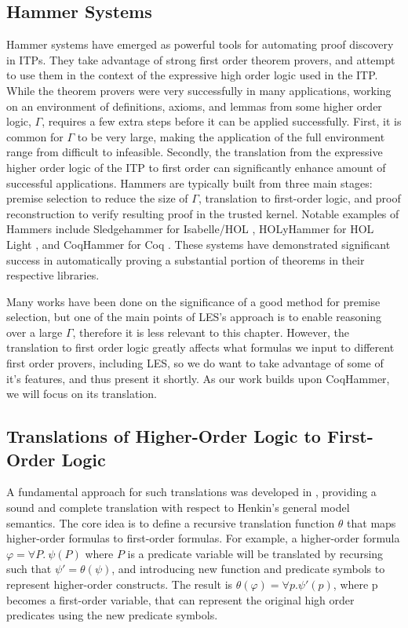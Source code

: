 \subsection{Hammer Systems}

Hammer systems have emerged as powerful tools for automating proof discovery in ITPs. 
They take advantage of strong first order theorem provers, and attempt to use them in the context of the expressive high order logic used in the ITP.
While the theorem provers were very successfully in many applications, working on an environment of definitions, axioms, and lemmas from some higher order logic, $\Gamma$, requires a few extra steps before it can be applied successfully.
First, it is common for $\Gamma$ to be very large, making the application of the full environment range from difficult to infeasible.
Secondly, the translation from the expressive higher order logic of the ITP to first order can significantly enhance amount of successful applications.
Hammers are typically built from three main stages: premise selection to reduce the size of $\Gamma$, translation to first-order logic, and proof reconstruction to verify resulting proof in the trusted kernel.
Notable examples of Hammers include Sledgehammer for Isabelle/HOL \cite{sledgehammer}, HOLyHammer for HOL Light \cite{holyhammer}, and CoqHammer for Coq \cite{coqhammer}. 
These systems have demonstrated significant success in automatically proving a substantial portion of theorems in their respective libraries.

Many works have been done on the significance of a good method for premise selection, but one of the main points of LES's approach is to enable reasoning over a large $\Gamma$, therefore it is less relevant to this chapter.
However, the translation to first order logic greatly affects what formulas we input to different first order provers, including LES, so we do want to take advantage of some of it's features, and thus present it shortly.
As our work builds upon CoqHammer, we will focus on its translation.

\subsection{Translations of Higher-Order Logic to First-Order Logic}

A fundamental approach for such translations was developed in \cite{kerber1990provecompleteembedding}, providing a sound and complete translation with respect to Henkin's general model semantics.
The core idea is to define a recursive translation function $\theta$ that maps higher-order formulas to first-order formulas. 
For example, a higher-order formula $\varphi = \forall P.~\psi(P)$ where $P$ is a predicate variable will be translated by recursing such that $\psi' = \theta(\psi)$, and introducing  new function and predicate symbols to represent higher-order constructs.
The result is $\theta(\varphi) = \forall p.\psi'(p)$, where p becomes a first-order variable, that can represent the original high order predicates using the new predicate symbols.

